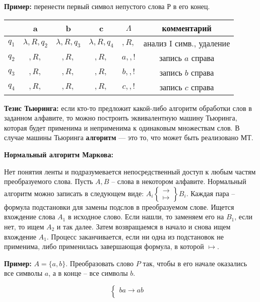 \textbf{Пример:} перенести первый символ непустого слова Р в его конец.
\begin{center}
\begin{tabular}{ |c||c|c|c|c||c| } 
\hline
       & a                   & b                   & c                  & $\Lambda$ & комментарий \\ 
\hline
\hline
 $q_1$ & $ \lambda, R, q_2 $ & $ \lambda, R, q_3 $ & $\lambda, R, q_4 $ & $, R,$    & анализ I симв., удаление \\ 
\hline
 $q_2$ & $, R,$              & $, R,$              & $, R,$             & $a, ,!$   & запись $a$ справа \\
\hline
 $q_3$ & $, R,$              & $, R,$              & $, R,$             & $b, ,!$   & запись $b$ справа \\
\hline
$q_4$  & $, R,$              & $, R,$              & $, R,$             & $c, ,!$   & запись $c$ справа \\
\hline
\end{tabular}
\end{center}

\textbf{Тезис Тьюринга:} если кто-то предложит какой-либо алгоритм обработки слов в заданном алфавите, то можно построить эквивалентную машину Тьюринга, которая будет применима и неприменима к одинаковым множествам слов.
В случае машины Тьюринга \textbf{алгоритм} --- это то, что может быть реализовано МТ.


\textbf{Нормальный алгоритм Маркова:}
        
Нет понятия ленты и подразумевается непосредственный доступ к любым частям преобразуемого слова. Пусть $A, B$ -- слова в некотором алфавите. Нормальный алгоритм можно записать в следующем виде: $A_i \left\{\begin{array}{lr} \to \\ \mapsto \end{array}\right\} B_i$.
Каждая пара -- формула подстановки для замены подслов в преобразуемом слове. Ищется вхождение слова $A_1$ в исходное слово. Если нашли, то заменяем его на $B_1$, если нет, то ищем $A_2$ и так далее. Затем возвращаемся в начало и снова ищем вхождение $A_1$. Процесс заканчивается, если ни одна из подстановок не применима, либо применилась завершающая формула, в которой $\mapsto$.

\textbf{Пример:} $A = \{a, b\}$. Преобразовать слово $P$ так, чтобы в его начале оказались все символы $a$, а в конце -- все символы $b$.

$$\begin{cases}
     ba \to ab &\\
\end{cases}$$

